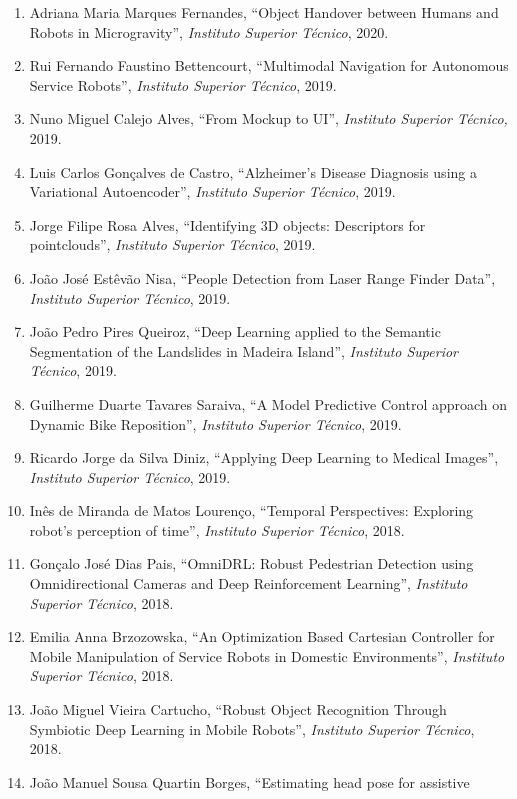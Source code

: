 \begin{enumerate}
  \emph{Instituto Superior Técnico}, 2020.
\item
  Adriana Maria Marques Fernandes, ``Object Handover between Humans and
  Robots in Microgravity'', \emph{Instituto Superior Técnico}, 2020.
\item
  Rui Fernando Faustino Bettencourt, ``Multimodal Navigation for
  Autonomous Service Robots'', \emph{Instituto Superior Técnico}, 2019.
\item
  Nuno Miguel Calejo Alves, ``From Mockup to UI'', \emph{Instituto
  Superior Técnico,} 2019.
\item
  Luis Carlos Gonçalves de Castro, ``Alzheimer's Disease Diagnosis using
  a Variational Autoencoder'', \emph{Instituto Superior Técnico}, 2019.
\item
  Jorge Filipe Rosa Alves, ``Identifying 3D objects: Descriptors for
  pointclouds'', \emph{Instituto Superior Técnico}, 2019.
\item
  João José Estêvão Nisa, ``People Detection from Laser Range Finder
  Data'', \emph{Instituto Superior Técnico}, 2019.
\item
  João Pedro Pires Queiroz, ``Deep Learning applied to the Semantic
  Segmentation of the Landslides in Madeira Island'', \emph{Instituto
  Superior Técnico}, 2019.
\item
  Guilherme Duarte Tavares Saraiva, ``A Model Predictive Control
  approach on Dynamic Bike Reposition'', \emph{Instituto Superior
  Técnico}, 2019.
\item
  Ricardo Jorge da Silva Diniz, ``Applying Deep Learning to Medical
  Images'', \emph{Instituto Superior Técnico}, 2019.
\item
  Inês de Miranda de Matos Lourenço, ``Temporal Perspectives: Exploring
  robot's perception of time'', \emph{Instituto Superior Técnico}, 2018.
\item
  Gonçalo José Dias Pais, ``OmniDRL: Robust Pedestrian Detection using
  Omnidirectional Cameras and Deep Reinforcement Learning'',
  \emph{Instituto Superior Técnico}, 2018.
\item
  Emilia Anna Brzozowska, ``An Optimization Based Cartesian Controller
  for Mobile Manipulation of Service Robots in Domestic Environments'',
  \emph{Instituto Superior Técnico}, 2018.
\item
  João Miguel Vieira Cartucho, ``Robust Object Recognition Through
  Symbiotic Deep Learning in Mobile Robots'', \emph{Instituto Superior
  Técnico}, 2018.
\item
  João Manuel Sousa Quartin Borges, ``Estimating head pose for assistive

\end{enumerate}
